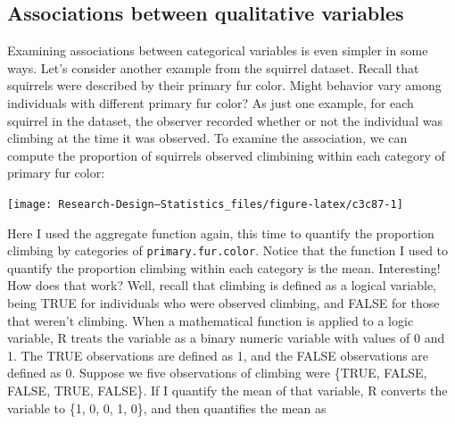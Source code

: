 \documentclass[
]{book}
\newenvironment{Shaded}{\begin{snugshade}}{\end{snugshade}}
\newcommand{\AttributeTok}[1]{\textcolor[rgb]{0.13,0.29,0.53}{#1}}
\newcommand{\CommentTok}[1]{\textcolor[rgb]{0.56,0.35,0.01}{\textit{#1}}}
\newcommand{\DecValTok}[1]{\textcolor[rgb]{0.00,0.00,0.81}{#1}}
\newcommand{\DocumentationTok}[1]{\textcolor[rgb]{0.56,0.35,0.01}{\textbf{\textit{#1}}}}
\newcommand{\FloatTok}[1]{\textcolor[rgb]{0.00,0.00,0.81}{#1}}
\newcommand{\FunctionTok}[1]{\textcolor[rgb]{0.13,0.29,0.53}{\textbf{#1}}}
\newcommand{\NormalTok}[1]{#1}
\newcommand{\OtherTok}[1]{\textcolor[rgb]{0.56,0.35,0.01}{#1}}
\newcommand{\SpecialCharTok}[1]{\textcolor[rgb]{0.81,0.36,0.00}{\textbf{#1}}}
\newcommand{\StringTok}[1]{\textcolor[rgb]{0.31,0.60,0.02}{#1}}
\begin{document}
\subsection{Associations between qualitative variables}\label{associations-between-qualitative-variables}

Examining associations between categorical variables is even simpler in some ways. Let's consider another example from the squirrel dataset. Recall that squirrels were described by their primary fur color. Might behavior vary among individuals with different primary fur color? As just one example, for each squirrel in the dataset, the observer recorded whether or not the individual was climbing at the time it was observed. To examine the association, we can compute the proportion of squirrels observed climbining within each category of primary fur color:

\begin{Shaded}
\end{Shaded}

\begin{center}\texttt{[image: Research-Design---Statistics\_files/figure-latex/c3c87-1]} \end{center}

Here I used the aggregate function again, this time to quantify the proportion climbing by categories of \texttt{primary.fur.color}. Notice that the function I used to quantify the proportion climbing within each category is the mean. Interesting! How does that work? Well, recall that climbing is defined as a logical variable, being TRUE for individuals who were observed climbing, and FALSE for those that weren't climbing. When a mathematical function is applied to a logic variable, R treats the variable as a binary numeric variable with values of 0 and 1. The TRUE observations are defined as 1, and the FALSE observations are defined as 0. Suppose we five observations of climbing were \{TRUE, FALSE, FALSE, TRUE, FALSE\}. If I quantify the mean of that variable, R converts the variable to \{1, 0, 0, 1, 0\}, and then quantifies the mean as
\end{document}
